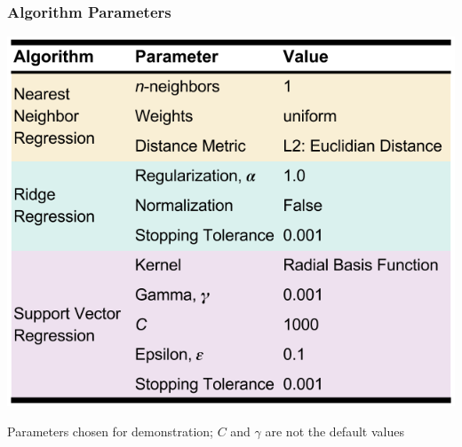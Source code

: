 \begin{frame}
  \frametitle{Algorithm Parameters}
  \begin{table}
    \centering
    \includegraphics[height=0.7\textheight]{./figures/defaults.png}
    \caption{Parameters chosen for demonstration; $C$ and $\gamma$ are not the default values}
  \end{table}
\end{frame}
